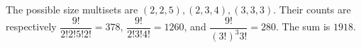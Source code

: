 The possible size multisets are $(2,2,5),(2,3,4),(3,3,3)$. Their counts are respectively $\dfrac{9!}{2!2!5!2!}=378$, $\dfrac{9!}{2!3!4!}=1260$, and $\dfrac{9!}{(3!)^3 3!}=280$. The sum is $\boxed{1918}$.
